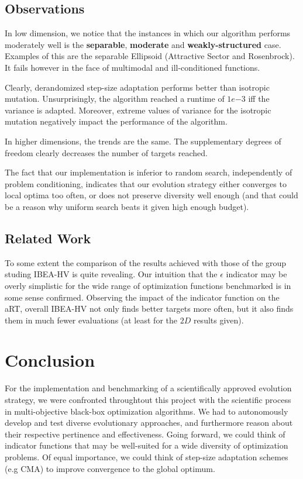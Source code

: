 \documentclass{sig-alternate}
\begin{document}
\subsection{Observations}

In low dimension, we notice that the instances in which our algorithm performs moderately well is the \textbf{separable}, \textbf{moderate} and \textbf{weakly-structured} case. Examples of this are the separable Ellipsoid (Attractive Sector and Rosenbrock). It fails however in the face of multimodal and ill-conditioned functions.

Clearly, derandomized step-size adaptation performs better than isotropic mutation. Unsurprisingly, the algorithm reached a runtime of $1e{-3}$ iff the variance is adapted. Moreover, extreme values of variance for the isotropic mutation negatively impact the performance of the algorithm.

In higher dimensions, the trends are the same. The supplementary degrees of freedom clearly decreases the number of targets reached.

The fact that our implementation is inferior to random search, independently of problem conditioning, indicates that our evolution strategy either converges to local optima too often, or does not preserve diversity well enough (and that could be a reason why uniform search beats it given high enough budget).

\subsection{Related Work}
To some extent the comparison of the results achieved with those of the group studing IBEA-HV is quite revealing. 
Our intuition that the $\epsilon$ indicator may be overly simplistic for the wide range of optimization functions benchmarked is in some sense confirmed. Observing the impact of the indicator function on the aRT, overall IBEA-HV not only finds better targets more often, but it also finds them in much fewer evaluations (at least for the $2D$ results given).

\section*{Conclusion}
For the implementation and benchmarking of a scientifically approved evolution strategy, we were confronted throughtout this project with the scientific process in multi-objective black-box optimization algorithms. We had to autonomously develop and test diverse evolutionary approaches, and furthermore reason about their respective pertinence and effectiveness. Going forward, we could think of indicator functions that may be  well-suited for a wide diversity of optimization problems. Of equal importance, we could think of step-size adaptation schemes (e.g CMA) to improve convergence to the global optimum.
\end{document}
